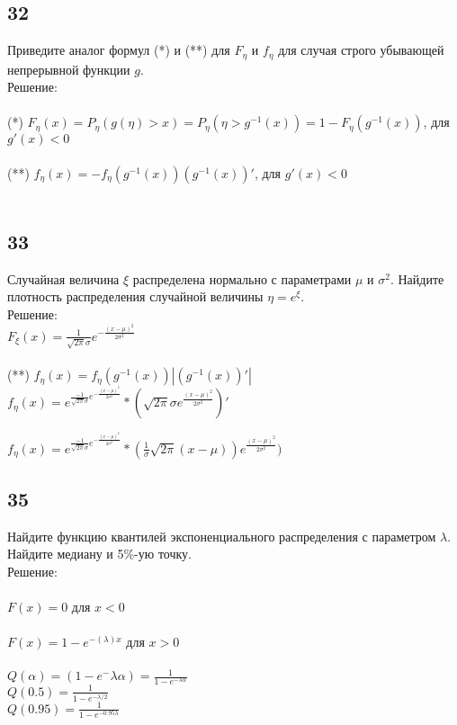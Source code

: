 \documentclass[a4paper, 12pt]{extarticle}
\numberwithin{figure}{section}
\begin{document}
\subsection*{32}
Приведите аналог формул (*) и (**) для $F_\eta$ и $f_\eta$ для случая строго убывающей непрерывной функции $g$.\\

Решение:\\
\\
(*) $F_\eta(x) = P_\eta(g(\eta)>x)=P_\eta(\eta>g^{-1}(x)) = 1 - F_\eta(g^{-1}(x))$, для $g'(x) < 0$\\
\\
(**) $f_\eta(x) = - f_\eta(g^{-1}(x))(g^{-1}(x))'$, для $g'(x) < 0$\\
\\


\subsection*{33}
Случайная величина $\xi$ распределена нормально с параметрами $\mu$ и $\sigma^2$. Найдите плотность распределения случайной величины $\eta = e^\xi$.\\

Решение:\\

$F_\xi(x) = \frac{1}{\sqrt{2\pi}\sigma}e^{-\frac{(x-\mu)^2}{2\sigma^2}}$\\
\\
(**) $f_\eta(x) = f_\eta(g^{-1}(x))|(g^{-1}(x))'|$\\

$f_\eta(x)=e^{\frac{-1}{\sqrt{2\pi}\sigma}e^{-\frac{(x-\mu)^2}{2\sigma^2}}}*(\sqrt{2\pi}\sigma e^{\frac{(x-\mu)^2}{2\sigma^2}})'$


$f_\eta(x)=e^{\frac{-1}{\sqrt{2\pi}\sigma}e^{-\frac{(x-\mu)^2}{2\sigma^2}}}*(\frac{1}{\sigma}\sqrt{2\pi}(x-\mu)) e^{\frac{(x-\mu)^2}{2\sigma^2}})$

\subsection*{35}
Найдите функцию квантилей экспоненциального распределения с параметром $\lambda$.\\
Найдите медиану и 5\%-ую точку.\\

Решение:\\
\\
$F(x)=0$ для $x<0$\\
\\
$F(x)=1-e^{-(\lambda)x}$ для $x>0$\\
\\
$Q(\alpha) = (1-e^-{\lambda\alpha}) = \frac{1}{1-e^{-\lambda\alpha}}$\\
$Q(0.5) = \frac{1}{1-e^{-\lambda/2}}$\\
$Q(0.95) = \frac{1}{1-e^{-0.95\lambda}}$\\
\end{document}
